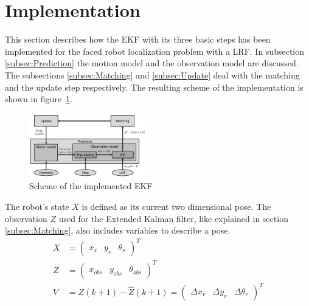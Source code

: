 \section{Implementation}
\label{sec:Implementation}


This section describes how the EKF with its three basic steps has been implemented for the faced robot localization problem with a LRF. In subsection \ref{subsec:Prediction} the motion model and the observation model are discussed. The subsections \ref{subsec:Matching} and \ref{subsec:Update} deal with the matching and the update step respectively. The resulting scheme of the implementation is shown in \mbox{figure \ref{fig:EKF_scheme}}. 

\begin{figure}[h]
\centering
\includegraphics[width=0.45\textwidth]{figures/scheme}
      \caption{Scheme of the implemented EKF}
      \label{fig:EKF_scheme}
\end{figure}

The robot's state $X$ is defined as its current two dimensional pose. The observation $Z$ used for the Extended Kalman filter, like explained in section \ref{subsec:Matching}, also includes variables to describe a pose. 
\begin{align}
X&=\begin{pmatrix}x_s & y_s & \theta_s \end{pmatrix}^T \label{eq:state_def} \\
Z&=\begin{pmatrix}x_{obs} & y_{obs} & \theta_{obs} \end{pmatrix}^T \label{eq:observation_def}\\
V&=Z(k+1)-\hat{Z}(k+1)=\begin{pmatrix} \Delta x_{v} & \Delta y_{v} & \Delta \theta_{v} \end{pmatrix}^T \label{eq:v_def}
\end{align}

